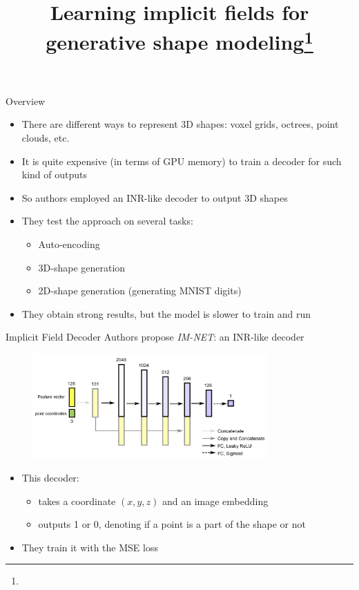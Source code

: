 \documentclass[handout, 10pt]{beamer}
\title{Learning implicit fields for generative shape modeling\footnote{\citepaper{IMNET}}}
\begin{document}
\begin{frame}
    \titlepage
\end{frame}

\begin{frame}{Overview}
\begin{itemize}
    \item\pause There are different ways to represent 3D shapes: voxel grids, octrees, point clouds, etc.
    \item\pause It is quite expensive (in terms of GPU memory) to train a decoder for such kind of outputs
    \item\pause So authors employed an INR-like decoder to output 3D shapes
    \item\pause They test the approach on several tasks:
    \begin{itemize}
        \item\pause Auto-encoding
        \item\pause 3D-shape generation
        \item\pause 2D-shape generation (generating MNIST digits)
    \end{itemize}
    \item\pause They obtain strong results, but the model is slower to train and run
\end{itemize}
\end{frame}

\begin{frame}{Implicit Field Decoder}
Authors propose \textit{IM-NET}: an INR-like decoder
\begin{figure}
    \centering
    \includegraphics[width=0.8\textwidth]{images/im-net}
\end{figure}
\begin{itemize}
    \item\pause This decoder:
    \begin{itemize}
        \item\pause takes a coordinate $(x,y,z)$ and an image embedding
        \item\pause outputs 1 or 0, denoting if a point is a part of the shape or not
    \end{itemize}
    \item\pause They train it with the MSE loss
\end{itemize}
\end{frame}
\end{document}
